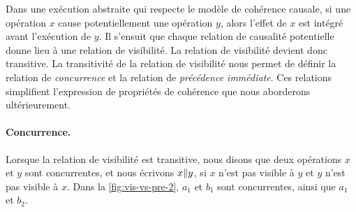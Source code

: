 Dans une exécution abstraite qui respecte le modèle de cohérence causale, si une opération $x$ cause potentiellement une opération $y$, alors l'effet de $x$ est intégré avant l'exécution de $y$.
Il s'ensuit que chaque relation de causalité potentielle donne lieu à une relation de visibilité.
La relation de visibilité devient donc transitive.
La transitivité de la relation de visibilité nous permet de définir la relation de \emph{concurrence} et la relation de \emph{précédence immédiate}.
Ces relations simplifient l'expression de propriétés de cohérence que nous aborderons ultérieurement.




\paragraph{Concurrence.}
Lorsque la relation de visibilité est transitive, nous disons que deux opérations $x$ et $y$ sont concurrentes, et nous écrivons $x \| y$, si $x$ n'est pas visible à $y$ et $y$ n'est pas visible à $x$.
Dans la \autoref{fig:vis-vs-pre-2}, $a_1$ et $b_1$ sont concurrentes, ainsi que $a_1$ et $b_2$.

